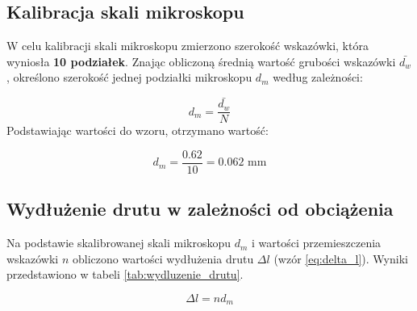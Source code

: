 \documentclass[a4paper,12pt]{article}
\begin{document}
\subsection{Kalibracja skali mikroskopu}

W celu kalibracji skali mikroskopu zmierzono szerokość wskazówki, która wyniosła \textbf{10 podziałek}. Znając obliczoną średnią wartość grubości wskazówki $\bar{d_w}$, określono szerokość jednej podziałki mikroskopu $d_m$ według zależności:

\begin{equation*}
    d_m = \frac{\bar{d_w}}{N}
\end{equation*}
Podstawiając wartości do wzoru, otrzymano wartość:

\begin{equation*}
    d_m = \frac{0.62}{10} = 0.062 \text{ mm}
\end{equation*}

\subsection{Wydłużenie drutu w zależności od obciążenia}

Na podstawie skalibrowanej skali mikroskopu $d_m$ i wartości przemieszczenia wskazówki $n$ obliczono wartości wydłużenia drutu $\Delta l$ (wzór \ref{eq:delta_l}). Wyniki przedstawiono w tabeli \ref{tab:wydluzenie_drutu}.

\begin{equation}
    \label{eq:delta_l}
    \Delta l = n  d_m
\end{equation}
\end{document}
